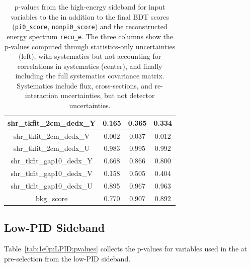 \begin{table}[H]
\begin{tabular}{| c | c | c | c | }
shr\_tkfit\_2cm\_dedx\_Y & 0.165 & 0.365 & 0.334 \\ \hline
shr\_tkfit\_2cm\_dedx\_V & 0.002 & 0.037 & 0.012 \\ \hline
shr\_tkfit\_2cm\_dedx\_U & 0.983 & 0.995 & 0.992 \\ \hline
shr\_tkfit\_gap10\_dedx\_Y & 0.668 & 0.866 & 0.800 \\ \hline
shr\_tkfit\_gap10\_dedx\_V & 0.158 & 0.505 & 0.404 \\ \hline
shr\_tkfit\_gap10\_dedx\_U & 0.895 & 0.967 & 0.963 \\ \hline
bkg\_score & 0.770 & 0.907 & 0.892 \\ \hline
 \end{tabular}
 \caption{\label{tab:1e0p:HE:pvalues}p-values from the high-energy \zpsel sideband for input variables to the \zpsel in addition to the final BDT scores (\texttt{pi0\_score}, \texttt{nonpi0\_score}) and the reconstructed energy spectrum \texttt{reco\_e}. The three columns show the p-values computed through statistics-only uncertainties (left), with systematics but not accounting for correlations in systematics (center), and finally including the full systematics covariance matrix. Systematics include flux, cross-sections, and re-interaction uncertainties, but not detector uncertainties.}
\end{table}

\subsection{\zpsel Low-PID Sideband}


Table~\ref{tab:1e0p:LPID:pvalues} collects the p-values for variables used in the \zpsel at pre-selection from the low-PID sideband.


